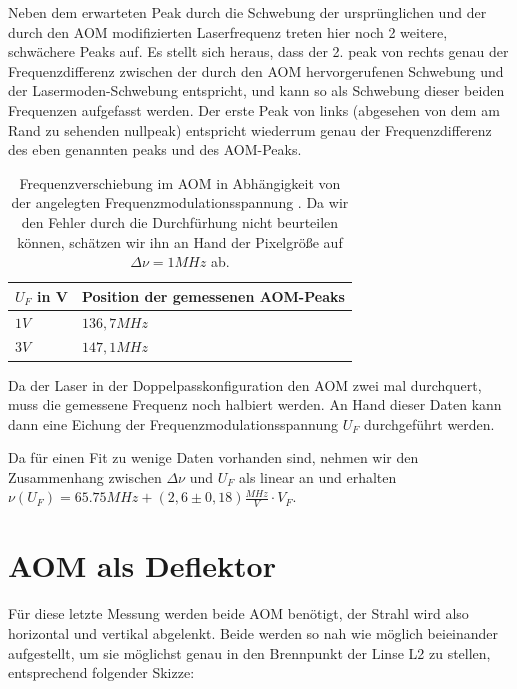 \documentclass[bigchapter,colorback,accentcolor=tud4b,linedtoc,11pt]{tudreport}
\begin{document}
Neben dem erwarteten Peak durch die Schwebung der ursprünglichen und der durch den AOM modifizierten Laserfrequenz treten hier noch 2 weitere, schwächere Peaks auf. Es stellt sich heraus, dass der 2. peak von rechts genau der Frequenzdifferenz zwischen der durch den AOM hervorgerufenen Schwebung und der Lasermoden-Schwebung entspricht, und kann so als Schwebung dieser beiden Frequenzen aufgefasst werden. Der erste Peak von links (abgesehen von dem am Rand zu sehenden nullpeak) entspricht wiederrum genau der Frequenzdifferenz des eben genannten peaks und des AOM-Peaks.

\begin{table}[H]
  \begin{center}
    \begin{tabular}{|p{3cm}|p{6cm}|}
      \hline
          $U_F$ in V & Position der gemessenen AOM-Peaks \\ \hline
          $1V$       & $136,7 MHz$                       \\ \hline
          $3V$       & $147,1 MHz$                       \\ \hline
    \end{tabular}
  \end{center}
  \caption{Frequenzverschiebung im AOM in Abhängigkeit von der angelegten Frequenzmodulationsspannung \cite{AndereGruppe}. Da wir den Fehler durch die Durchfürhung nicht beurteilen können, schätzen wir ihn an Hand der Pixelgröße auf $\Delta \nu = 1MHz$ ab.}
\end{table}

Da der Laser in der Doppelpasskonfiguration den AOM zwei mal durchquert, muss die gemessene Frequenz noch halbiert werden. An Hand dieser Daten kann dann eine Eichung der Frequenzmodulationsspannung $U_F$ durchgeführt werden. 

Da für einen Fit zu wenige Daten vorhanden sind, nehmen wir den Zusammenhang zwischen $\Delta \nu$ und $U_F$ als linear an und erhalten $\nu\left( U_F \right) = 65.75 MHz + \left( 2,6 \pm 0,18 \right)\frac{MHz}{V} \cdot V_F$.


\section{AOM als Deflektor}

Für diese letzte Messung werden beide AOM benötigt, der Strahl wird also horizontal und vertikal abgelenkt. Beide werden so nah wie möglich beieinander aufgestellt, um sie möglichst genau in den Brennpunkt der Linse L2 zu stellen, entsprechend folgender Skizze:
\end{document}
